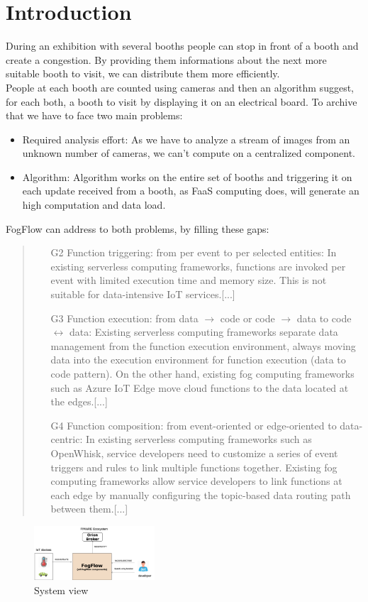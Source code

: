 \documentclass[conference]{ieeeconf}
\begin{document}
\section{Introduction}
During an exhibition with several booths people can stop in front of a booth and create a congestion. By providing them informations about the next more suitable booth to visit, we can distribute them more efficiently.\\
People at each booth are counted using cameras and then an algorithm suggest, for each both, a booth to visit by displaying it on an electrical board.
To archive that we have to face two main problems:
\begin{itemize}
    \item Required analysis effort: As we have to analyze a stream of images from an unknown number of cameras, we can't compute on a centralized component.
    \item Algorithm: Algorithm works on the entire set of booths and triggering it on each update received from a booth, as FaaS computing does, will generate an high computation and data load.
\end{itemize}{}
FogFlow can address to both problems, by filling these gaps:\\
\begin{quote}
    \begin{enumerate}
        \item[G2] Function triggering: from per event to per selected entities: In existing serverless computing frameworks, functions are invoked per event with limited execution time and memory size. This is not suitable for data-intensive IoT services.[...]
        \item[G3] Function execution: from data $\rightarrow$ code or code $\rightarrow$ data to code $\leftrightarrow$ data: Existing serverless computing frameworks separate data management from the function execution environment, always moving data into the execution environment for function execution (data to code pattern). On the other hand, existing fog computing frameworks such as Azure IoT Edge move cloud functions to the data located at the edges.[...]
        \item[G4] Function composition: from event-oriented or edge-oriented to data-centric: 
        In existing serverless computing frameworks such as OpenWhisk, service developers need to customize a series of event triggers and rules to link multiple functions together. Existing fog computing frameworks allow service developers to link functions at each edge by manually configuring the topic-based data routing path between them.[...]
    \end{enumerate}{}
\end{quote}
\cite{cheng2019fog}
\begin{figure}[h]
    \centering
    \includegraphics[width=0.4\textwidth]{Images/systemview.png}
    \caption{System view}
\end{figure}{}
\end{document}

